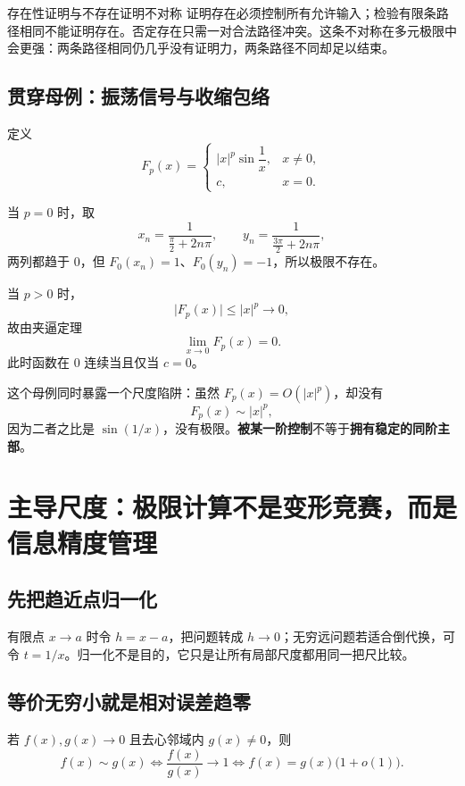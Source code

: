 \documentclass[11pt,a4paper]{ctexart}
\newcommand{\kw}[1]{\textbf{\color{deep}#1}}
\begin{document}
\begin{corebox}{存在性证明与不存在证明不对称}
证明存在必须控制所有允许输入；检验有限条路径相同不能证明存在。否定存在只需一对合法路径冲突。这条不对称在多元极限中会更强：两条路径相同仍几乎没有证明力，两条路径不同却足以结束。
\end{corebox}

\subsection{贯穿母例：振荡信号与收缩包络}

定义
\[
F_p(x)=
\begin{cases}
\lvert x\rvert^p\sin\dfrac1x,&x\ne0,\\
c,&x=0.
\end{cases}
\]

当 $p=0$ 时，取
\[
x_n=\frac{1}{\frac\pi2+2n\pi},\qquad
y_n=\frac{1}{\frac{3\pi}{2}+2n\pi},
\]
两列都趋于 $0$，但 $F_0(x_n)=1$、$F_0(y_n)=-1$，所以极限不存在。

当 $p>0$ 时，
\[
\lvert F_p(x)\rvert\le \lvert x\rvert^p\to0,
\]
故由夹逼定理
\[
\lim_{x\to0}F_p(x)=0.
\]
此时函数在 $0$ 连续当且仅当 $c=0$。

这个母例同时暴露一个尺度陷阱：虽然 $F_p(x)=O(\lvert x\rvert^p)$，却没有
\[
F_p(x)\sim \lvert x\rvert^p,
\]
因为二者之比是 $\sin(1/x)$，没有极限。\kw{被某一阶控制}不等于\kw{拥有稳定的同阶主部}。

\section{主导尺度：极限计算不是变形竞赛，而是信息精度管理}

\subsection{先把趋近点归一化}

有限点 $x\to a$ 时令 $h=x-a$，把问题转成 $h\to0$；无穷远问题若适合倒代换，可令 $t=1/x$。归一化不是目的，它只是让所有局部尺度都用同一把尺比较。

\subsection{等价无穷小就是相对误差趋零}

若 $f(x),g(x)\to0$ 且去心邻域内 $g(x)\ne0$，则
\[
f(x)\sim g(x)
\iff \frac{f(x)}{g(x)}\to1
\iff f(x)=g(x)\bigl(1+o(1)\bigr).
\]
\end{document}
